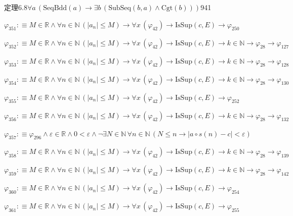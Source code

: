 \begin{fullproof}{定理6.8}{$\forall a\,(\mathrm{SeqBdd}(a) \to \exists b\,(\mathrm{SubSeq}(b,a) \land \mathrm{Cgt}(b)))$}{941}
\begin{abbrevlist}
\item $\varphi_{351} :\equiv M \in \mathbb{R} \land \forall n \in \mathbb{N}\,(\lvert a_{n} \rvert \leq M) \to \forall x\,(\varphi_{42}) \to \mathrm{IsSup}(c,E) \to \varphi_{250}$
\item $\varphi_{352} :\equiv M \in \mathbb{R} \land \forall n \in \mathbb{N}\,(\lvert a_{n} \rvert \leq M) \to \forall x\,(\varphi_{42}) \to \mathrm{IsSup}(c,E) \to k \in \mathbb{N} \to \varphi_{28} \to \varphi_{127}$
\item $\varphi_{353} :\equiv M \in \mathbb{R} \land \forall n \in \mathbb{N}\,(\lvert a_{n} \rvert \leq M) \to \forall x\,(\varphi_{42}) \to \mathrm{IsSup}(c,E) \to k \in \mathbb{N} \to \varphi_{28} \to \varphi_{128}$
\item $\varphi_{354} :\equiv M \in \mathbb{R} \land \forall n \in \mathbb{N}\,(\lvert a_{n} \rvert \leq M) \to \forall x\,(\varphi_{42}) \to \mathrm{IsSup}(c,E) \to k \in \mathbb{N} \to \varphi_{28} \to \varphi_{130}$
\item $\varphi_{355} :\equiv M \in \mathbb{R} \land \forall n \in \mathbb{N}\,(\lvert a_{n} \rvert \leq M) \to \forall x\,(\varphi_{42}) \to \mathrm{IsSup}(c,E) \to \varphi_{252}$
\item $\varphi_{356} :\equiv M \in \mathbb{R} \land \forall n \in \mathbb{N}\,(\lvert a_{n} \rvert \leq M) \to \forall x\,(\varphi_{42}) \to \mathrm{IsSup}(c,E) \to k \in \mathbb{N} \to \varphi_{28} \to \varphi_{132}$
\item $\varphi_{357} :\equiv \varphi_{296} \land \varepsilon \in \mathbb{R} \land 0 < \varepsilon \land \neg \exists N \in \mathbb{N}\,\forall n \in \mathbb{N}\,(N \leq n \to \lvert a \circ s(n) - c \rvert < \varepsilon)$
\item $\varphi_{358} :\equiv M \in \mathbb{R} \land \forall n \in \mathbb{N}\,(\lvert a_{n} \rvert \leq M) \to \forall x\,(\varphi_{42}) \to \mathrm{IsSup}(c,E) \to k \in \mathbb{N} \to \varphi_{28} \to \varphi_{139}$
\item $\varphi_{359} :\equiv M \in \mathbb{R} \land \forall n \in \mathbb{N}\,(\lvert a_{n} \rvert \leq M) \to \forall x\,(\varphi_{42}) \to \mathrm{IsSup}(c,E) \to k \in \mathbb{N} \to \varphi_{28} \to \varphi_{142}$
\item $\varphi_{360} :\equiv M \in \mathbb{R} \land \forall n \in \mathbb{N}\,(\lvert a_{n} \rvert \leq M) \to \forall x\,(\varphi_{42}) \to \mathrm{IsSup}(c,E) \to \varphi_{254}$
\item $\varphi_{361} :\equiv M \in \mathbb{R} \land \forall n \in \mathbb{N}\,(\lvert a_{n} \rvert \leq M) \to \forall x\,(\varphi_{42}) \to \mathrm{IsSup}(c,E) \to \varphi_{255}$

\end{abbrevlist}
\end{fullproof}
